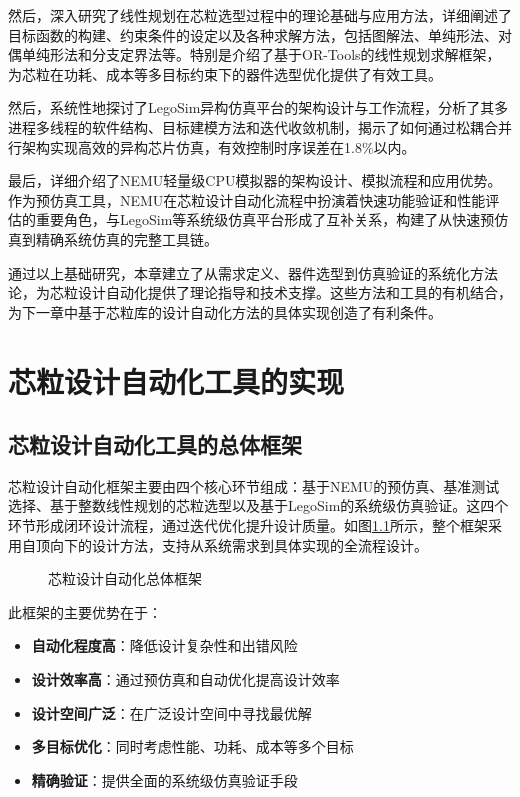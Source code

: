 \documentclass[bachelor]{thesis-uestc}
\begin{document}
然后，深入研究了线性规划在芯粒选型过程中的理论基础与应用方法，详细阐述了目标函数的构建、约束条件的设定以及各种求解方法，包括图解法、单纯形法、对偶单纯形法和分支定界法等。特别是介绍了基于OR-Tools的线性规划求解框架，为芯粒在功耗、成本等多目标约束下的器件选型优化提供了有效工具。

然后，系统性地探讨了LegoSim异构仿真平台的架构设计与工作流程，分析了其多进程多线程的软件结构、目标建模方法和迭代收敛机制，揭示了如何通过松耦合并行架构实现高效的异构芯片仿真，有效控制时序误差在1.8\%以内。

最后，详细介绍了NEMU轻量级CPU模拟器的架构设计、模拟流程和应用优势。作为预仿真工具，NEMU在芯粒设计自动化流程中扮演着快速功能验证和性能评估的重要角色，与LegoSim等系统级仿真平台形成了互补关系，构建了从快速预仿真到精确系统仿真的完整工具链。

通过以上基础研究，本章建立了从需求定义、器件选型到仿真验证的系统化方法论，为芯粒设计自动化提供了理论指导和技术支撑。这些方法和工具的有机结合，为下一章中基于芯粒库的设计自动化方法的具体实现创造了有利条件。





\chapter{芯粒设计自动化工具的实现}

\section{芯粒设计自动化工具的总体框架}

芯粒设计自动化框架主要由四个核心环节组成：基于NEMU的预仿真、基准测试选择、基于整数线性规划的芯粒选型以及基于LegoSim的系统级仿真验证。这四个环节形成闭环设计流程，通过迭代优化提升设计质量。如图\ref{fig:framework}所示，整个框架采用自顶向下的设计方法，支持从系统需求到具体实现的全流程设计。

\begin{figure}[htbp]
    \caption{芯粒设计自动化总体框架}
    \label{fig:framework}
\end{figure}

此框架的主要优势在于：
\begin{itemize}
    \item \textbf{自动化程度高}：降低设计复杂性和出错风险
    \item \textbf{设计效率高}：通过预仿真和自动优化提高设计效率
    \item \textbf{设计空间广泛}：在广泛设计空间中寻找最优解
    \item \textbf{多目标优化}：同时考虑性能、功耗、成本等多个目标
    \item \textbf{精确验证}：提供全面的系统级仿真验证手段
\end{itemize}
\end{document}
